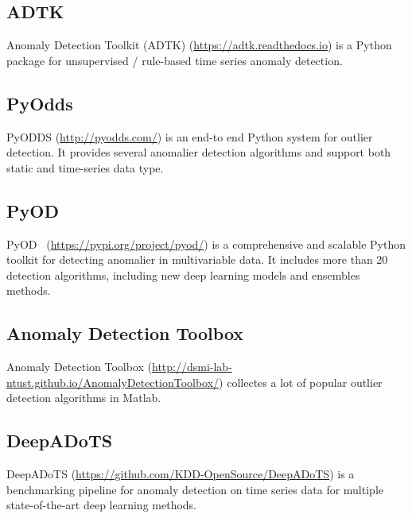 \subsection{ADTK}

Anomaly Detection Toolkit (ADTK) (\href{https://adtk.readthedocs.io}{https://adtk.readthedocs.io}) is a Python package for
unsupervised / rule-based time series anomaly detection.

\subsection{PyOdds}

PyODDS (\href{http://pyodds.com/}{http://pyodds.com/}) is an end-to end Python system for
outlier detection. 
It provides several anomalier detection algorithms and 
support both static and time-series data type.

\subsection{PyOD}
PyOD~\cite{zhao2019pyod} (\href{https://pypi.org/project/pyod/}{https://pypi.org/project/pyod/})
is a comprehensive and scalable Python toolkit for
detecting anomalier in multivariable data.  
It includes more than 20 detection algorithms, 
including new deep learning models and ensembles methods.
\subsection{Anomaly Detection Toolbox}

Anomaly Detection Toolbox
(\href{http://dsmi-lab-ntust.github.io/AnomalyDetectionToolbox/}{http://dsmi-lab-ntust.github.io/AnomalyDetectionToolbox/})
collectes a lot of popular outlier detection algorithms in Matlab.

\subsection{DeepADoTS}

DeepADoTS (\href{https://github.com/KDD-OpenSource/DeepADoTS}{https://github.com/KDD-OpenSource/DeepADoTS})
is a benchmarking pipeline for anomaly detection on
time series data for
multiple state-of-the-art deep learning methods.


